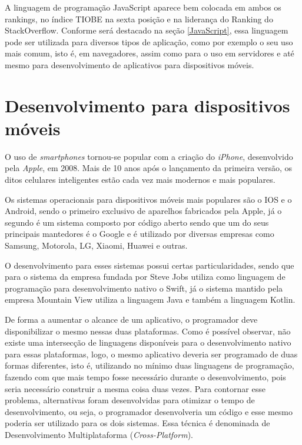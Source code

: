 A linguagem de programação JavaScript aparece bem colocada em ambos os rankings, no índice TIOBE na sexta posição e na liderança do Ranking do StackOverflow. Conforme será destacado na seção \ref{JavaScript}, essa linguagem pode ser utilizada para diversos tipos de aplicação, como por exemplo o seu uso mais comum, isto é, em navegadores, assim como para o uso em servidores e até mesmo para desenvolvimento de aplicativos para dispositivos móveis.

\section{Desenvolvimento para dispositivos móveis}

O uso de \textit{smartphones} tornou-se popular com a criação do \textit{iPhone}, desenvolvido pela \textit{Apple}, em 2008. Mais de 10 anos após o lançamento da primeira versão, os ditos celulares inteligentes estão cada vez mais modernos e mais populares.


Os sistemas operacionais para dispositivos móveis mais populares são o IOS e o Android, sendo o primeiro exclusivo de aparelhos fabricados pela Apple, já o segundo é um sistema composto por código aberto sendo que um do seus principais mantedores é o Google e é utilizado por diversas empresas como Samsung, Motorola, LG, Xiaomi, Huawei e outras.

O desenvolvimento para esses sistemas possui certas particularidades, sendo que para o sistema da empresa fundada por Steve Jobs utiliza como linguagem de programação para desenvolvimento nativo o Swift, já o sistema mantido pela empresa Mountain View utiliza a linguagem Java e também a linguagem Kotlin.

De forma a aumentar o alcance de um aplicativo, o programador deve disponibilizar o mesmo nessas duas plataformas. Como é possível observar, não existe uma intersecção de linguagens disponíveis para o desenvolvimento nativo para essas plataformas, logo, o mesmo aplicativo deveria ser programado de duas formas diferentes, isto é, utilizando no mínimo duas linguagens de programação, fazendo com que mais tempo fosse necessário durante o desenvolvimento, pois seria necessário construir a mesma coisa duas vezes. Para contornar esse problema, alternativas foram desenvolvidas para otimizar o tempo de desenvolvimento, ou seja, o programador desenvolveria um código e esse mesmo poderia ser utilizado para os dois sistemas. Essa técnica é denominada de Desenvolvimento Multiplataforma (\textit{Cross-Platform}).

